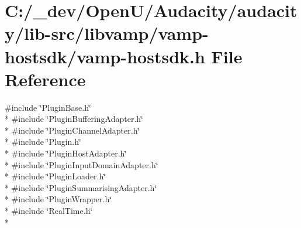 \hypertarget{vamp-hostsdk_8h}{}\section{C\+:/\+\_\+dev/\+Open\+U/\+Audacity/audacity/lib-\/src/libvamp/vamp-\/hostsdk/vamp-\/hostsdk.h File Reference}
\label{vamp-hostsdk_8h}
{\ttfamily \#include \char`\"{}Plugin\+Base.\+h\char`\"{}}\\*
{\ttfamily \#include \char`\"{}Plugin\+Buffering\+Adapter.\+h\char`\"{}}\\*
{\ttfamily \#include \char`\"{}Plugin\+Channel\+Adapter.\+h\char`\"{}}\\*
{\ttfamily \#include \char`\"{}Plugin.\+h\char`\"{}}\\*
{\ttfamily \#include \char`\"{}Plugin\+Host\+Adapter.\+h\char`\"{}}\\*
{\ttfamily \#include \char`\"{}Plugin\+Input\+Domain\+Adapter.\+h\char`\"{}}\\*
{\ttfamily \#include \char`\"{}Plugin\+Loader.\+h\char`\"{}}\\*
{\ttfamily \#include \char`\"{}Plugin\+Summarising\+Adapter.\+h\char`\"{}}\\*
{\ttfamily \#include \char`\"{}Plugin\+Wrapper.\+h\char`\"{}}\\*
{\ttfamily \#include \char`\"{}Real\+Time.\+h\char`\"{}}\\*
